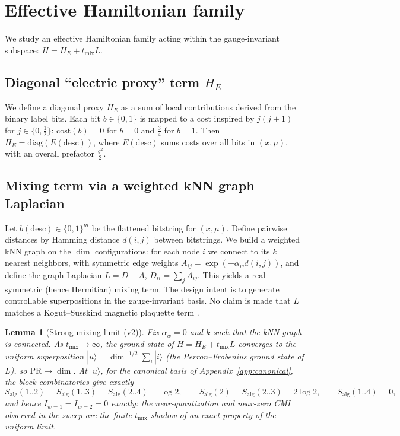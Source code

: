 \documentclass[11pt]{article}
\newtheorem{lemma}{Lemma}
\theoremstyle{remark}
\newcommand{\Salg}{S_{\mathrm{alg}}}
\begin{document}
\section{Effective Hamiltonian family}

We study an effective Hamiltonian family acting within the
gauge-invariant subspace: $H = H_E + t_{\mathrm{mix}} L$.

\subsection{Diagonal ``electric proxy'' term $H_E$}

We define a diagonal proxy $H_E$ as a sum of local contributions derived
from the binary label bits. Each bit $b \in \{0, 1\}$ is mapped to a
cost inspired by $j(j+1)$ for $j \in \{0, \frac12\}$: $\mathrm{cost}(b)
= 0$ for $b = 0$ and $\frac34$ for $b = 1$. Then $H_E =
\mathrm{diag}(E(\mathrm{desc}))$, where $E(\mathrm{desc})$ sums costs
over all bits in $(x, \mu)$, with an overall prefactor $\frac{g^2}{2}$.

\subsection{Mixing term via a weighted kNN graph Laplacian}

Let $b(\mathrm{desc}) \in \{0, 1\}^m$ be the flattened bitstring for
$(x, \mu)$. Define pairwise distances by Hamming distance $d(i, j)$
between bitstrings. We build a weighted kNN graph on the $\dim$
configurations: for each node $i$ we connect to its $k$ nearest
neighbors, with symmetric edge weights $A_{ij} = \exp(-\alpha_w d(i,
j))$, and define the graph Laplacian $L = D - A$, $D_{ii} = \sum_j
A_{ij}$. This yields a real symmetric (hence Hermitian) mixing term. The
design intent is to generate controllable superpositions in the
gauge-invariant basis. No claim is made that $L$ matches a
Kogut--Susskind magnetic plaquette term \cite{KS}.

\begin{lemma}[Strong-mixing limit (v2)]
\label{lem:uniform}
Fix $\alpha_w = 0$ and $k$ such that the kNN graph is connected. As
$t_{\mathrm{mix}} \to \infty$, the ground state of $H = H_E +
t_{\mathrm{mix}} L$ converges to the uniform superposition
$|u\rangle = \dim^{-1/2}\sum_i |i\rangle$ (the Perron--Frobenius ground
state of $L$), so $\mathrm{PR} \to \dim$. At $|u\rangle$, for the
canonical basis of Appendix~\ref{app:canonical}, the block combinatorics
give \emph{exactly}
\[
\Salg(1..2) = \Salg(1..3) = \Salg(2..4) = \log 2, \qquad
\Salg(2) = \Salg(2..3) = 2\log 2, \qquad \Salg(1..4) = 0,
\]
and hence $I_{w=1} = I_{w=2} = 0$ exactly: the near-quantization and
near-zero CMI observed in the sweep are the finite-$t_{\mathrm{mix}}$
shadow of an exact property of the uniform limit.
\end{lemma}
\end{document}
